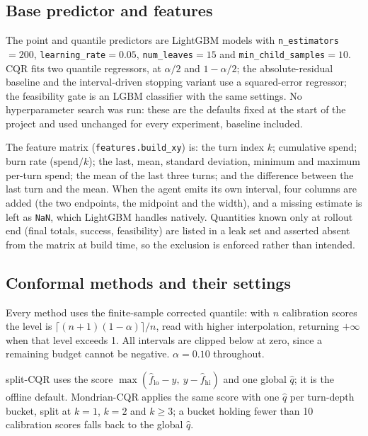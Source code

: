 \documentclass{article}
\begin{document}
\subsection{Base predictor and features}
\label{app:predictor}

The point and quantile predictors are LightGBM models \cite{ke2017lightgbm} with
\texttt{n\_estimators}${=}200$, \texttt{learning\_rate}${=}0.05$,
\texttt{num\_leaves}${=}15$ and \texttt{min\_child\_samples}${=}10$. CQR fits two
quantile regressors, at $\alpha/2$ and $1{-}\alpha/2$; the absolute-residual baseline
and the interval-driven stopping variant use a squared-error regressor; the feasibility
gate is an LGBM classifier with the same settings. No hyperparameter search was run:
these are the defaults fixed at the start of the project and used unchanged for every
experiment, baseline included.

The feature matrix (\texttt{features.build\_xy}) is: the turn index $k$; cumulative
spend; burn rate ($\mathrm{spend}/k$); the last, mean, standard deviation, minimum and
maximum per-turn spend; the mean of the last three turns; and the difference between
the last turn and the mean. When the agent emits its own interval, four columns are
added (the two endpoints, the midpoint and the width), and a missing estimate is left
as \texttt{NaN}, which LightGBM handles natively. Quantities known only at rollout end
(final totals, success, feasibility) are listed in a leak set and asserted absent from
the matrix at build time, so the exclusion is enforced rather than intended.

\subsection{Conformal methods and their settings}
\label{app:conformal}

Every method uses the finite-sample corrected quantile: with $n$ calibration scores the
level is $\lceil (n+1)(1{-}\alpha) \rceil / n$, read with higher interpolation,
returning $+\infty$ when that level exceeds 1. All intervals are clipped below at zero,
since a remaining budget cannot be negative. $\alpha{=}0.10$ throughout.

split-CQR uses the score $\max(\hat f_{\mathrm{lo}}-y,\ y-\hat f_{\mathrm{hi}})$ and
one global $\hat q$; it is the offline default. Mondrian-CQR applies the same score
with one $\hat q$ per turn-depth bucket, split at $k{=}1$, $k{=}2$ and $k{\geq}3$; a
bucket holding fewer than 10 calibration scores falls back to the global $\hat q$.
\end{document}
